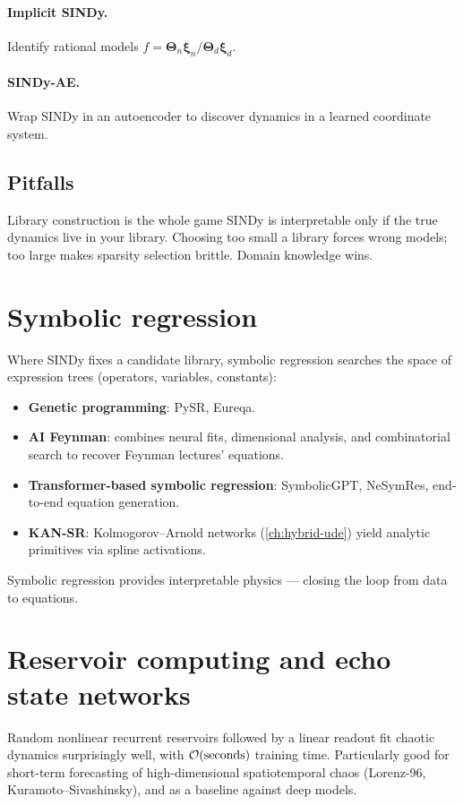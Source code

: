 \paragraph{Implicit SINDy.}
Identify rational models $f=\bm{\Theta}_n\bm{\xi}_n / \bm{\Theta}_d\bm{\xi}_d$.
\paragraph{SINDy-AE.}
Wrap SINDy in an autoencoder to discover dynamics in a learned
coordinate system.

\subsection{Pitfalls}
\begin{pitfall}{Library construction is the whole game}
SINDy is interpretable only if the true dynamics live in your library.
Choosing too small a library forces wrong models; too large makes
sparsity selection brittle. Domain knowledge wins.
\end{pitfall}

\section{Symbolic regression}
Where SINDy fixes a candidate library, symbolic regression searches the
space of expression trees (operators, variables, constants):
\begin{itemize}
\item \textbf{Genetic programming}: PySR, Eureqa.
\item \textbf{AI Feynman}: combines neural fits, dimensional analysis,
and combinatorial search to recover Feynman lectures' equations.
\item \textbf{Transformer-based symbolic regression}: SymbolicGPT,
NeSymRes, end-to-end equation generation.
\item \textbf{KAN-SR}: Kolmogorov--Arnold networks (\cref{ch:hybrid-ude})
yield analytic primitives via spline activations.
\end{itemize}
Symbolic regression provides interpretable physics --- closing the loop
from data to equations.

\section{Reservoir computing and echo state networks}
Random nonlinear recurrent reservoirs followed by a linear readout fit
chaotic dynamics surprisingly well, with $\mathcal{O}(\text{seconds})$ training
time. Particularly good for short-term forecasting of high-dimensional
spatiotemporal chaos (Lorenz-96, Kuramoto--Sivashinsky), and as a
baseline against deep models.

